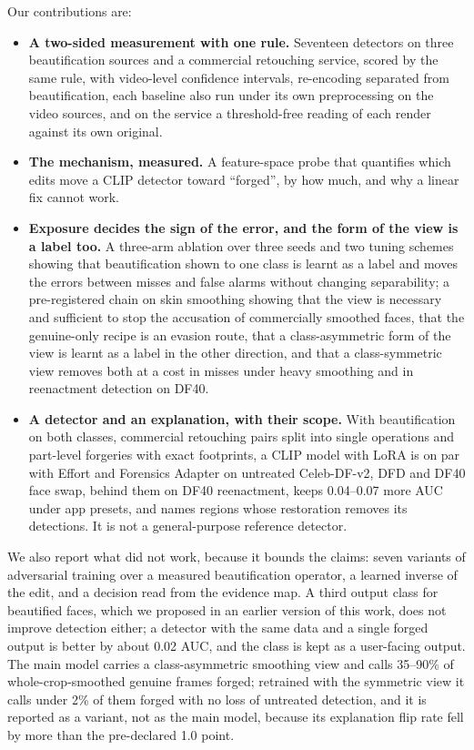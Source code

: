 \documentclass[conference]{IEEEtran}
\begin{document}
Our contributions are:
\begin{itemize}
\item \textbf{A two-sided measurement with one rule.} Seventeen detectors on three beautification sources and a
commercial retouching service, scored by the same rule, with video-level confidence intervals, re-encoding separated
from beautification, each baseline also run under its own preprocessing on the video sources, and on the service a
threshold-free reading of each render against its own original.
\item \textbf{The mechanism, measured.} A feature-space probe that quantifies which edits move a CLIP detector toward
``forged'', by how much, and why a linear fix cannot work.
\item \textbf{Exposure decides the sign of the error, and the form of the view is a label too.} A three-arm ablation
over three seeds and two tuning schemes showing that beautification shown to one class is learnt as a label and moves
the errors between misses and false alarms without changing separability; a pre-registered chain on skin smoothing
showing that the view is necessary and sufficient to stop the accusation of commercially smoothed faces, that the
genuine-only recipe is an evasion route, that a class-asymmetric form of the view is learnt as a label in the other
direction, and that a class-symmetric view removes both at a cost in misses under heavy smoothing and in reenactment
detection on DF40.
\item \textbf{A detector and an explanation, with their scope.} With beautification on both classes, commercial
retouching pairs split into single operations and part-level forgeries with exact footprints, a CLIP model with LoRA is
on par with Effort and Forensics Adapter on untreated Celeb-DF-v2, DFD and DF40 face swap, behind them on DF40
reenactment, keeps 0.04--0.07 more AUC under app presets, and names regions whose restoration removes its detections.
It is not a general-purpose reference detector.
\end{itemize}
We also report what did not work, because it bounds the claims: seven variants of adversarial training over a measured
beautification operator, a learned inverse of the edit, and a decision read from the evidence map. A third output class
for beautified faces, which we proposed in an earlier version of this work, does not improve detection either; a detector
with the same data and a single forged output is better by about 0.02 AUC, and the class is kept as a user-facing output.
The main model carries a class-asymmetric smoothing view and calls 35--90\% of whole-crop-smoothed genuine frames
forged; retrained with the symmetric view it calls under 2\% of them forged with no loss of untreated detection, and it
is reported as a variant, not as the main model, because its explanation flip rate fell by more than the pre-declared
1.0 point.
\end{document}
